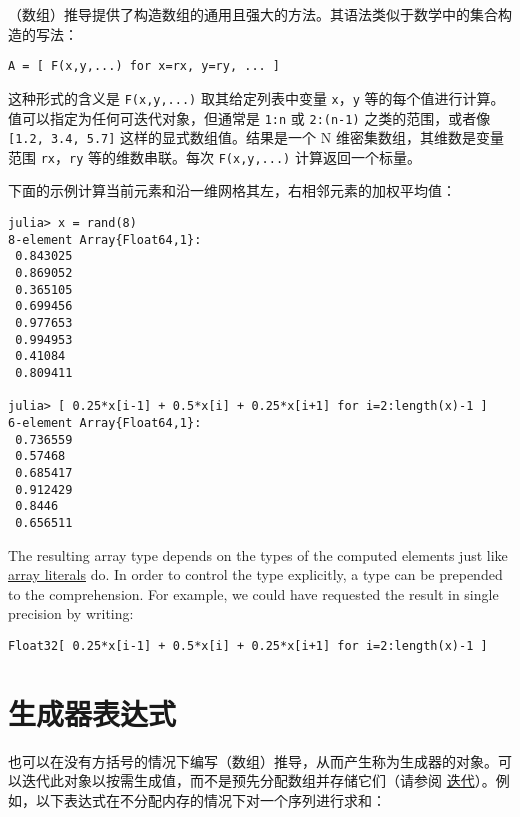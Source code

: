 （数组）推导提供了构造数组的通用且强大的方法。其语法类似于数学中的集合构造的写法：




\begin{lstlisting}
A = [ F(x,y,...) for x=rx, y=ry, ... ]
\end{lstlisting}



这种形式的含义是 \texttt{F(x,y,...)} 取其给定列表中变量 \texttt{x}，\texttt{y} 等的每个值进行计算。值可以指定为任何可迭代对象，但通常是 \texttt{1:n} 或 \texttt{2:(n-1)} 之类的范围，或者像 \texttt{[1.2, 3.4, 5.7]} 这样的显式数组值。结果是一个 N 维密集数组，其维数是变量范围 \texttt{rx}，\texttt{ry} 等的维数串联。每次 \texttt{F(x,y,...)} 计算返回一个标量。



下面的示例计算当前元素和沿一维网格其左，右相邻元素的加权平均值：




\begin{verbatim}
julia> x = rand(8)
8-element Array{Float64,1}:
 0.843025
 0.869052
 0.365105
 0.699456
 0.977653
 0.994953
 0.41084
 0.809411

julia> [ 0.25*x[i-1] + 0.5*x[i] + 0.25*x[i+1] for i=2:length(x)-1 ]
6-element Array{Float64,1}:
 0.736559
 0.57468
 0.685417
 0.912429
 0.8446
 0.656511
\end{verbatim}



The resulting array type depends on the types of the computed elements just like \hyperlink{13961675686342166416}{array literals} do. In order to control the type explicitly, a type can be prepended to the comprehension. For example, we could have requested the result in single precision by writing:




\begin{verbatim}
Float32[ 0.25*x[i-1] + 0.5*x[i] + 0.25*x[i+1] for i=2:length(x)-1 ]
\end{verbatim}



\hypertarget{5737546333215614116}{}


\section{生成器表达式}



也可以在没有方括号的情况下编写（数组）推导，从而产生称为生成器的对象。可以迭代此对象以按需生成值，而不是预先分配数组并存储它们（请参阅 \hyperlink{13048041929642713791}{迭代}）。例如，以下表达式在不分配内存的情况下对一个序列进行求和：




